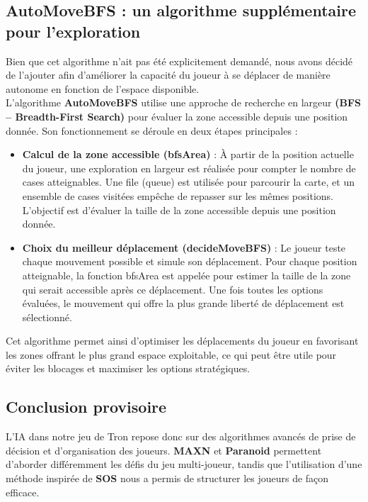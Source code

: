 \subsection{AutoMoveBFS : un algorithme supplémentaire pour l'exploration}
Bien que cet algorithme n'ait pas été explicitement demandé, nous avons décidé de l'ajouter afin d'améliorer la capacité du joueur à se déplacer de manière autonome en fonction de l’espace disponible. \\
L'algorithme \textbf{AutoMoveBFS} utilise une approche de recherche en largeur \textbf{(BFS – Breadth-First Search)} pour évaluer la zone accessible depuis une position donnée. Son fonctionnement se déroule en deux étapes principales :
\begin{itemize}
    \item \textbf{Calcul de la zone accessible (bfsArea)} : À partir de la position actuelle du joueur, une exploration en largeur est réalisée pour compter le nombre de cases atteignables. Une file (queue) est utilisée pour parcourir la carte, et un ensemble de cases visitées empêche de repasser sur les mêmes positions. L’objectif est d’évaluer la taille de la zone accessible depuis une position donnée.
    \item \textbf{Choix du meilleur déplacement (decideMoveBFS)} : Le joueur teste chaque mouvement possible et simule son déplacement. Pour chaque position atteignable, la fonction bfsArea est appelée pour estimer la taille de la zone qui serait accessible après ce déplacement. Une fois toutes les options évaluées, le mouvement qui offre la plus grande liberté de déplacement est sélectionné.
\end{itemize}
Cet algorithme permet ainsi d’optimiser les déplacements du joueur en favorisant les zones offrant le plus grand espace exploitable, ce qui peut être utile pour éviter les blocages et maximiser les options stratégiques.

\subsection{Conclusion provisoire}
L'IA dans notre jeu de Tron repose donc sur des algorithmes avancés de prise de décision et d'organisation des joueurs. \textbf{MAXN} et \textbf{Paranoid} permettent d'aborder différemment les défis du jeu multi-joueur, tandis que l'utilisation d'une méthode inspirée de \textbf{SOS} nous a permis de structurer les joueurs de façon efficace.
